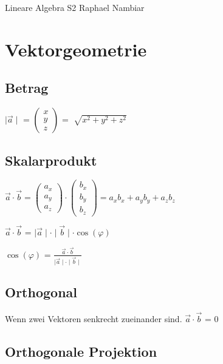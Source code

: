 



\begin{multicols*}{3}

\DocumentInfo
{Lineare Algebra S2} %
{Raphael Nambiar} %

\WhiteSpace

\section{Vektorgeometrie}
\subsection{Betrag}

$\mid \vec{a} \mid  $ = 
$\begin{pmatrix}
x\\
y\\
z
\end{pmatrix}$ = $ \sqrt[]{x^2+y^2+z^2}$
\WhiteSpace
\subsection{Skalarprodukt}

$\vec{a} \cdot \vec{b} =  \begin{pmatrix}
a_x\\
a_y\\
a_z
\end{pmatrix} \cdot \begin{pmatrix}
b_x\\
b_y\\
b_z
\end{pmatrix} = a_xb_x+a_yb_y+a_zb_z$

$ \vec{a} \cdot \vec{b} $ = $ \mid \vec{a} \mid \cdot \mid \vec{b} \mid \cdot \cos(\varphi)$

$\cos(\varphi) $ = $\frac{\vec{a} \cdot \vec{b}}{\mid \vec{a} \mid \cdot \mid \vec{b} \mid} $

\WhiteSpace
\subsection{Orthogonal}
{Wenn zwei Vektoren senkrecht zueinander sind.}
$ \vec{a} \cdot \vec{b} $ = 0
\WhiteSpace
\subsection{Orthogonale Projektion}


\end{multicols*}
